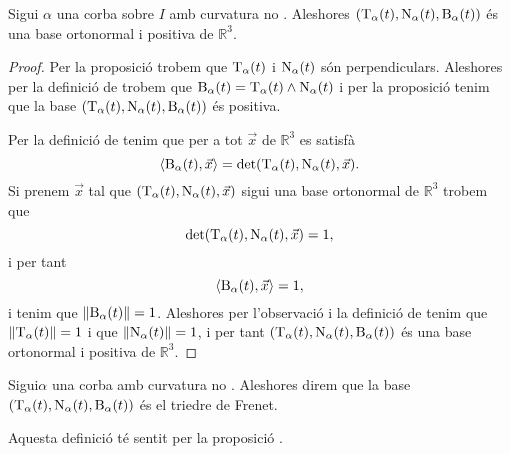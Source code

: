 \documentclass[../Apunts.tex]{subfiles}
\begin{document}
	\begin{proposition}
		\label{prop:triedre de Frenet}
		Sigui \(\alpha\) una corba sobre \(I\) amb curvatura no \nulla{}. Aleshores \((\operatorname{T}_{\alpha}(t),\operatorname{N}_{\alpha}(t),\operatorname{B}_{\alpha}(t))\) és una base ortonormal i positiva de \(\mathbb{R}^{3}\).
		\begin{proof}
			Per la proposició  trobem que \(\operatorname{T}_{\alpha}(t)\) i \(\operatorname{N}_{\alpha}(t)\) són perpendiculars. Aleshores per la definició de  trobem que \(\operatorname{B}_{\alpha}(t)=\operatorname{T}_{\alpha}(t)\mathbin{\wedge}\operatorname{N}_{\alpha}(t)\) i per la proposició  tenim que la base \((\operatorname{T}_{\alpha}(t),\operatorname{N}_{\alpha}(t),\operatorname{B}_{\alpha}(t))\) és positiva.
			
			Per la definició de  tenim que per a tot \(\vec{x}\) de \(\mathbb{R}^{3}\) es satisfà
			\[\prodesc{\binormal_{\alpha}(t)}{\vec{x}}=\det(\tangent_{\alpha}(t),\normal_{\alpha}(t),\vec{x}).\]
			Si prenem \(\vec{x}\) tal que \((\operatorname{T}_{\alpha}(t),\operatorname{N}_{\alpha}(t),\vec{x})\) sigui una base ortonormal de \(\mathbb{R}^{3}\) trobem que
			\[\det(\operatorname{T}_{\alpha}(t),\operatorname{N}_{\alpha}(t),\vec{x})=1,\]
			i per tant
			\[\prodesc{\binormal_{\alpha}(t)}{\vec{x}}=1,\]
			i tenim que \(\norm{\binormal_{\alpha}(t)}=1\). Aleshores per l'observació  i la definició de  tenim que \(\norm{\tangent_{\alpha}(t)}=1\) i que \(\norm{\normal_{\alpha}(t)}=1\), i per tant \((\operatorname{T}_{\alpha}(t),\operatorname{N}_{\alpha}(t),\operatorname{B}_{\alpha}(t))\) és una base ortonormal i positiva de \(\mathbb{R}^{3}\). %
		\end{proof}
	\end{proposition}
	\begin{definition}
		\label{def:triedre de Frenet}
		Sigui\(\alpha\) una corba amb curvatura no \nulla{}. Aleshores direm que la base \((\operatorname{T}_{\alpha}(t),\operatorname{N}_{\alpha}(t),\operatorname{B}_{\alpha}(t))\) és el triedre de Frenet.
		
		Aquesta definició té sentit per la proposició .
	\end{definition}
\end{document}
